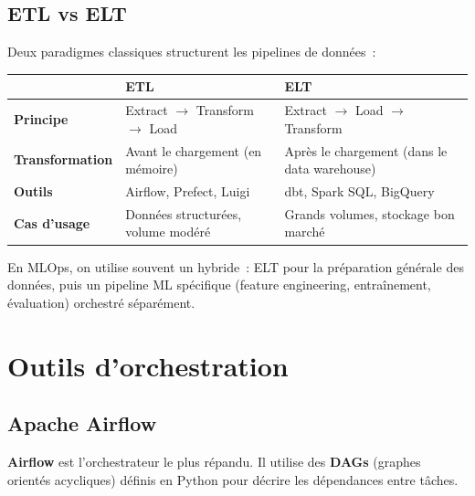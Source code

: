 \subsection{ETL vs ELT}

Deux paradigmes classiques structurent les pipelines de donn\'ees~:

\begin{center}
\begin{tabular}{@{}lp{5.5cm}p{5.5cm}@{}}
\toprule
& \textbf{ETL} & \textbf{ELT} \\
\midrule
\textbf{Principe} & Extract $\to$ Transform $\to$ Load &
  Extract $\to$ Load $\to$ Transform \\
\textbf{Transformation} & Avant le chargement (en m\'emoire) &
  Apr\`es le chargement (dans le data warehouse) \\
\textbf{Outils} & Airflow, Prefect, Luigi &
  dbt, Spark SQL, BigQuery \\
\textbf{Cas d'usage} & Donn\'ees structur\'ees, volume mod\'er\'e &
  Grands volumes, stockage bon march\'e \\
\bottomrule
\end{tabular}
\end{center}

\begin{remarque}
En MLOps, on utilise souvent un hybride~: ELT pour la pr\'eparation
g\'en\'erale des donn\'ees, puis un pipeline ML sp\'ecifique (feature
engineering, entra\^inement, \'evaluation) orchestr\'e s\'epar\'ement.
\end{remarque}

\section{Outils d'orchestration}
\label{sec:orchestration-tools}

\subsection{Apache Airflow}

\textbf{Airflow} est l'orchestrateur le plus r\'epandu. Il utilise des
\textbf{DAGs} (graphes orient\'es acycliques) d\'efinis en Python pour
d\'ecrire les d\'ependances entre t\^aches.

